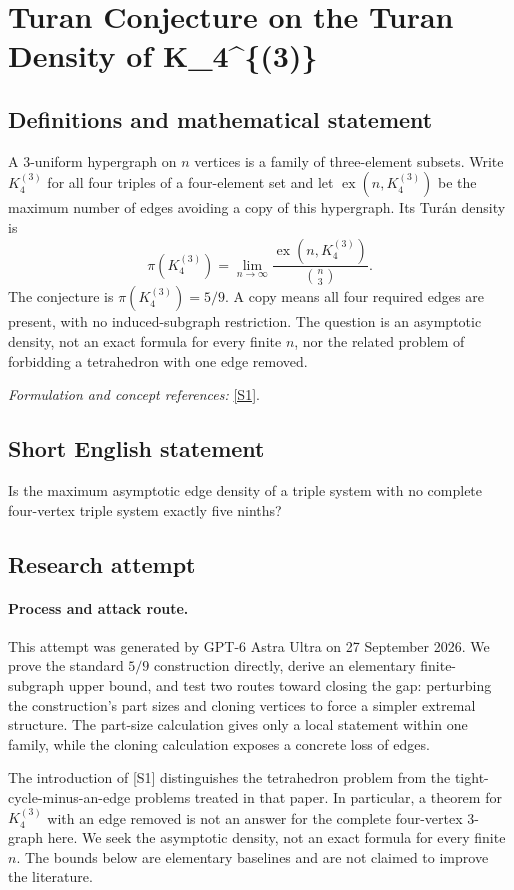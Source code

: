 \documentclass[11pt]{article}
\begin{document}
\section*{\texorpdfstring{Turan Conjecture on the Turan Density of K\_4\textasciicircum{}\{(3)\}}{Turan Conjecture on the Turan Density of K\_4\textasciicircum{}\{(3)\}}}\label{406}
\subsection{Definitions and mathematical statement}
A $3$-uniform hypergraph on $n$ vertices is a family of three-element subsets. Write $K_4^{(3)}$ for all four triples of a four-element set and let $\operatorname{ex}(n,K_4^{(3)})$ be the maximum number of edges avoiding a copy of this hypergraph. Its Tur\'an density is
\[
 \pi(K_4^{(3)})=\lim_{n\to\infty}
 \frac{\operatorname{ex}(n,K_4^{(3)})}{\binom n3}.
\]
The conjecture is $\pi(K_4^{(3)})=5/9$. A copy means all four required edges are present, with no induced-subgraph restriction. The question is an asymptotic density, not an exact formula for every finite $n$, nor the related problem of forbidding a tetrahedron with one edge removed.
\par\smallskip\textit{Formulation and concept references:} \href{https://lidicky.name/pub/c5-.pdf}{[S1]}.

\subsection{Short English statement}
Is the maximum asymptotic edge density of a triple system with no complete four-vertex triple system exactly five ninths?
\subsection{Research attempt}
\paragraph{Process and attack route.}
This attempt was generated by GPT-6 Astra Ultra on 27 September 2026. We prove the standard $5/9$ construction directly, derive an elementary finite-subgraph upper bound, and test two routes toward closing the gap: perturbing the construction's part sizes and cloning vertices to force a simpler extremal structure. The part-size calculation gives only a local statement within one family, while the cloning calculation exposes a concrete loss of edges.

The introduction of [S1] distinguishes the tetrahedron problem from the tight-cycle-minus-an-edge problems treated in that paper. In particular, a theorem for $K_4^{(3)}$ with an edge removed is not an answer for the complete four-vertex 3-graph here. We seek the asymptotic density, not an exact formula for every finite $n$. The bounds below are elementary baselines and are not claimed to improve the literature.
\end{document}
